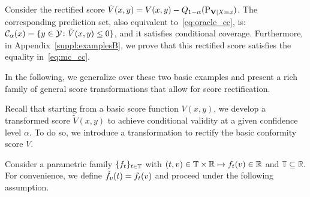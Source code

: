  \begin{example}
  \label{example:additive} Consider the rectified score 
    $\tilde{V}(x, y) = V(x, y) - Q_{1-\alpha}(\textup{P}_{\mathbf{V}|X=x})$.
    The corresponding prediction set, also equivalent to~\eqref{eq:oracle_cc}, is:
    $\mathcal{C}_{\alpha}(x) = \{y \in \mathcal{Y}\colon \tilde{V}(x, y) \leq 0 \}$,
    and it satisfies conditional coverage. Furthermore, in Appendix~\ref{suppl:examplesB}, we prove that this rectified score satisfies the equality in~\eqref{eq:mc_cc}.
  \end{example}
  In the following, we generalize over these two basic examples and present a rich family of general score transformations that allow for score rectification.

  Recall that starting from a basic score function \(V(x, y)\), we develop a transformed score \(\tilde{V}(x, y)\) to achieve conditional validity at a given confidence level $\alpha$. To do so, we introduce a transformation to rectify the basic conformity score \(V\). 
  
  Consider a parametric family \(\{f_{t}\}_{t \in \mathbb{T}}\) with \((t, v) \in \mathbb{T} \times \mathbb{R} \mapsto f_{t}(v) \in \mathbb{R}\) and $\mathbb{T} \subseteq \mathbb{R}$. For convenience, we define \(\tilde{f}_{v}(t) = f_{t}(v)\) and proceed under the following assumption. 
    
